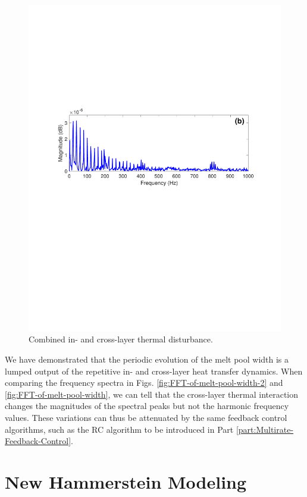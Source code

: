 \documentclass [11pt, proquest] {uwthesis}[2020/02/24]
\begin{document}
\begin{figure}[!ht]
\begin{centering}
{\begin{centering}
\includegraphics[clip,width=12cm]{Closed-loop-simulation/crosslayer_1200K}
\par\end{centering}
}
\par\end{centering}
\centering{}\caption{\label{fig:In-cross-layer-melt-pool}Combined in- and cross-layer
thermal disturbance. }
\end{figure}
We have demonstrated that the periodic evolution of the melt pool
width is a lumped output of the repetitive in- and cross-layer heat
transfer dynamics. When comparing the frequency spectra in Figs. \ref{fig:FFT-of-melt-pool-width-2}
and \ref{fig:FFT-of-melt-pool-width}, we can tell that the cross-layer
thermal interaction changes the magnitudes of the spectral peaks but
not the harmonic frequency values. These variations can thus be attenuated
by the same feedback control algorithms, such as the RC algorithm
to be introduced in Part \ref{part:Multirate-Feedback-Control}.



\chapter{New Hammerstein Modeling} \label{chap:New-Hammerstein-Modeling}
\end{document}
